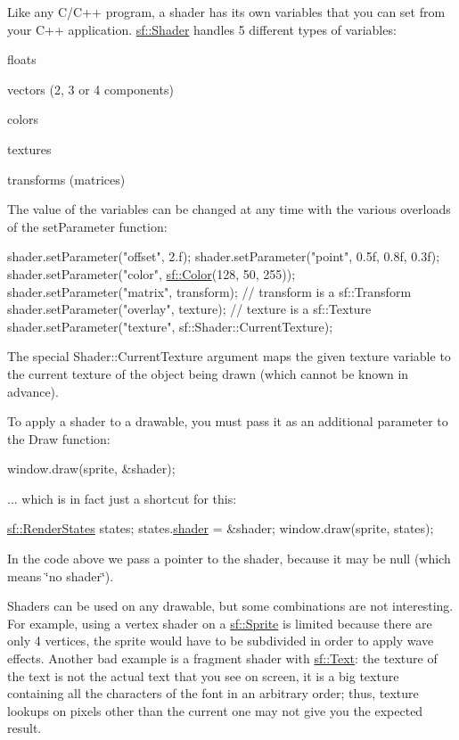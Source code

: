 Like any C/\+C++ program, a shader has its own variables that you can set from your C++ application. \hyperlink{classsf_1_1_shader}{sf\+::\+Shader} handles 5 different types of variables\+: \begin{DoxyItemize}
\item floats \item vectors (2, 3 or 4 components) \item colors \item textures \item transforms (matrices)\end{DoxyItemize}
The value of the variables can be changed at any time with the various overloads of the set\+Parameter function\+: 
\begin{DoxyCode}
shader.setParameter(\textcolor{stringliteral}{"offset"}, 2.f);
shader.setParameter(\textcolor{stringliteral}{"point"}, 0.5f, 0.8f, 0.3f);
shader.setParameter(\textcolor{stringliteral}{"color"}, \hyperlink{classsf_1_1_color}{sf::Color}(128, 50, 255));
shader.setParameter(\textcolor{stringliteral}{"matrix"}, transform); \textcolor{comment}{// transform is a sf::Transform}
shader.setParameter(\textcolor{stringliteral}{"overlay"}, texture); \textcolor{comment}{// texture is a sf::Texture}
shader.setParameter(\textcolor{stringliteral}{"texture"}, sf::Shader::CurrentTexture);
\end{DoxyCode}


The special Shader\+::\+Current\+Texture argument maps the given texture variable to the current texture of the object being drawn (which cannot be known in advance).

To apply a shader to a drawable, you must pass it as an additional parameter to the Draw function\+: 
\begin{DoxyCode}
window.draw(sprite, &shader);
\end{DoxyCode}


... which is in fact just a shortcut for this\+: 
\begin{DoxyCode}
\hyperlink{classsf_1_1_render_states}{sf::RenderStates} states;
states.\hyperlink{classsf_1_1_render_states_ad4f79ecdd0c60ed0d24fbe555b221bd8}{shader} = &shader;
window.draw(sprite, states);
\end{DoxyCode}


In the code above we pass a pointer to the shader, because it may be null (which means \char`\"{}no shader\char`\"{}).

Shaders can be used on any drawable, but some combinations are not interesting. For example, using a vertex shader on a \hyperlink{classsf_1_1_sprite}{sf\+::\+Sprite} is limited because there are only 4 vertices, the sprite would have to be subdivided in order to apply wave effects. Another bad example is a fragment shader with \hyperlink{classsf_1_1_text}{sf\+::\+Text}\+: the texture of the text is not the actual text that you see on screen, it is a big texture containing all the characters of the font in an arbitrary order; thus, texture lookups on pixels other than the current one may not give you the expected result.

